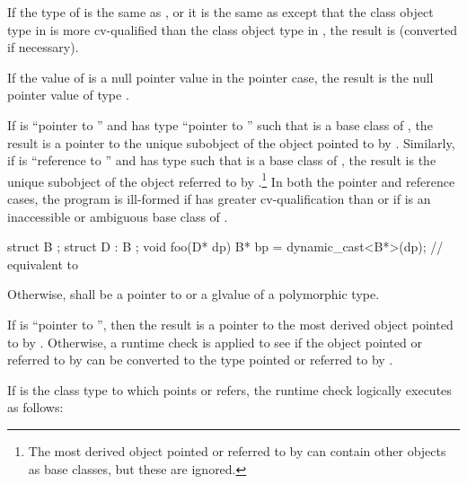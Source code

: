 \pnum
If the type of  is the same as , or it is
the same as  except that the class object type in  is
more cv-qualified than the class object type in , the result is
 (converted if necessary).

\pnum
If the value of  is a null pointer value in the pointer case,
the result is the null pointer value of type .

\pnum
If  is ``pointer to  '' and  has
type ``pointer to  '' such that  is a base
class of , the result is a pointer to the unique 
subobject of the  object pointed to by . Similarly, if
 is ``reference to  '' and  has
type   such that  is a base class of
, the result is the unique  subobject of the 
object referred to by .\footnote{The most derived
object pointed or referred to by
 can contain other  objects as base classes, but these
are ignored.}
In both the pointer and
reference cases, the program is ill-formed if  has greater
cv-qualification than  or if  is an inaccessible or
ambiguous base class of .
\begin{example}

\begin{codeblock}
struct B { };
struct D : B { };
void foo(D* dp) {
  B*  bp = dynamic_cast<B*>(dp);    // equivalent to 
}
\end{codeblock}
\end{example}

\pnum
Otherwise,  shall be a pointer to or a glvalue of a polymorphic
type.

\pnum
If  is ``pointer to  '', then the result
is a pointer to the most derived object pointed to by .
Otherwise, a runtime check is applied to see if the object pointed or
referred to by  can be converted to the type pointed or
referred to by .

\pnum
If  is the class type to which  points or refers, the runtime
check logically executes as follows:

